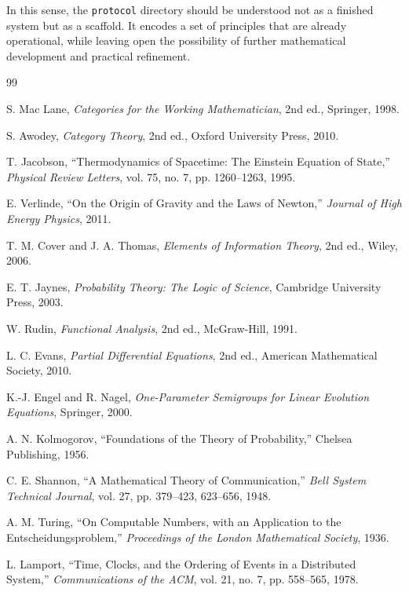 \documentclass[11pt,oneside]{article}
\begin{document}
In this sense, the \texttt{protocol} directory should be understood not as a finished system but as a scaffold. It encodes a set of principles that are already operational, while leaving open the possibility of further mathematical development and practical refinement.

\newpage
\begin{thebibliography}{99}

S. Mac Lane,
\textit{Categories for the Working Mathematician},
2nd ed., Springer, 1998.

S. Awodey,
\textit{Category Theory},
2nd ed., Oxford University Press, 2010.

T. Jacobson,
``Thermodynamics of Spacetime: The Einstein Equation of State,''
\textit{Physical Review Letters}, vol. 75, no. 7, pp. 1260--1263, 1995.

E. Verlinde,
``On the Origin of Gravity and the Laws of Newton,''
\textit{Journal of High Energy Physics}, 2011.

T. M. Cover and J. A. Thomas,
\textit{Elements of Information Theory},
2nd ed., Wiley, 2006.

E. T. Jaynes,
\textit{Probability Theory: The Logic of Science},
Cambridge University Press, 2003.

W. Rudin,
\textit{Functional Analysis},
2nd ed., McGraw-Hill, 1991.

L. C. Evans,
\textit{Partial Differential Equations},
2nd ed., American Mathematical Society, 2010.

K.-J. Engel and R. Nagel,
\textit{One-Parameter Semigroups for Linear Evolution Equations},
Springer, 2000.

A. N. Kolmogorov,
``Foundations of the Theory of Probability,''
Chelsea Publishing, 1956.

C. E. Shannon,
``A Mathematical Theory of Communication,''
\textit{Bell System Technical Journal}, vol. 27, pp. 379--423, 623--656, 1948.

A. M. Turing,
``On Computable Numbers, with an Application to the Entscheidungsproblem,''
\textit{Proceedings of the London Mathematical Society}, 1936.

L. Lamport,
``Time, Clocks, and the Ordering of Events in a Distributed System,''
\textit{Communications of the ACM}, vol. 21, no. 7, pp. 558--565, 1978.


\end{thebibliography}
\end{document}
